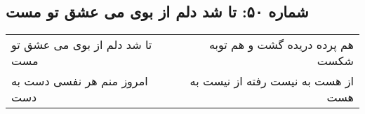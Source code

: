 \begin{center}
\section*{شماره ۵۰: تا شد دلم از بوی می عشق تو مست}
\label{sec:050}
\begin{longtable}{l p{0.5cm} r}
تا شد دلم از بوی می عشق تو مست
&&
هم پرده دریده گشت و هم توبه شکست
\\
امروز منم هر نفسی دست به دست
&&
از هست به نیست رفته از نیست به هست
\\
\end{longtable}
\end{center}
